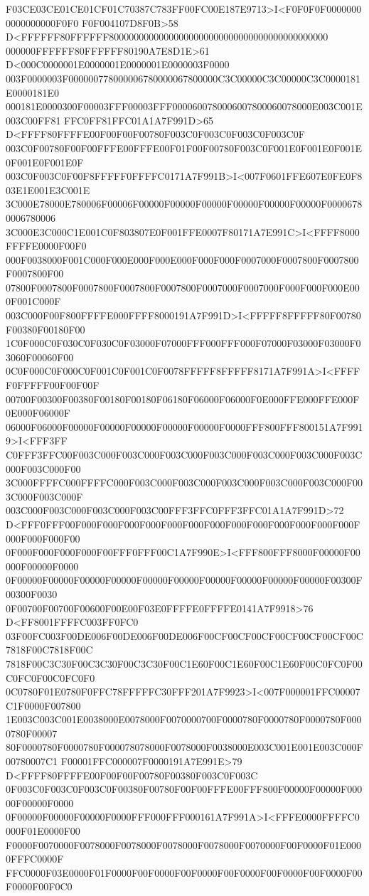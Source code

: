 F03CE03CE01CE01CF01C70387C783FF00FC00E187E9713>I<F0F0F0F00000000000000000F0F0
F0F004107D8F0B>58 D<FFFFFF80FFFFFF80000000000000000000000000000000000000000000
000000FFFFFF80FFFFFF80190A7E8D1E>61 D<000C0000001E0000001E0000001E0000003F0000
003F0000003F000000778000006780000067800000C3C00000C3C00000C3C0000181E0000181E0
000181E0000300F00003FFF00003FFF0000600780006007800060078000E003C001E003C00FF81
FFC0FF81FFC01A1A7F991D>65 D<FFFF80FFFFE00F00F00F00780F003C0F003C0F003C0F003C0F
003C0F00780F00F00FFFE00FFFE00F01F00F00780F003C0F001E0F001E0F001E0F001E0F001E0F
003C0F003C0F00F8FFFFF0FFFFC0171A7F991B>I<007F0601FFE607E0FE0F803E1E001E3C001E
3C000E78000E780006F00006F00000F00000F00000F00000F00000F00000F00006780006780006
3C000E3C000C1E001C0F803807E0F001FFE0007F80171A7E991C>I<FFFF8000FFFFE0000F00F0
000F0038000F001C000F000E000F000E000F000F000F0007000F0007800F0007800F0007800F00
07800F0007800F0007800F0007800F0007800F0007000F0007000F000F000F000E000F001C000F
003C000F00F800FFFFE000FFFF8000191A7F991D>I<FFFFF8FFFFF80F00780F00380F00180F00
1C0F000C0F030C0F030C0F03000F07000FFF000FFF000F07000F03000F03000F03060F00060F00
0C0F000C0F000C0F001C0F001C0F0078FFFFF8FFFFF8171A7F991A>I<FFFFF0FFFFF00F00F00F
00700F00300F00380F00180F00180F06180F06000F06000F0E000FFE000FFE000F0E000F06000F
06000F06000F00000F00000F00000F00000F00000F0000FFF800FFF800151A7F9919>I<FFF3FF
C0FFF3FFC00F003C000F003C000F003C000F003C000F003C000F003C000F003C000F003C000F00
3C000FFFFC000FFFFC000F003C000F003C000F003C000F003C000F003C000F003C000F003C000F
003C000F003C000F003C000F003C00FFF3FFC0FFF3FFC01A1A7F991D>72
D<FFF0FFF00F000F000F000F000F000F000F000F000F000F000F000F000F000F000F000F000F00
0F000F000F000F000F00FFF0FFF00C1A7F990E>I<FFF800FFF8000F00000F00000F00000F0000
0F00000F00000F00000F00000F00000F00000F00000F00000F00000F00000F00300F00300F0030
0F00700F00700F00600F00E00F03E0FFFFE0FFFFE0141A7F9918>76 D<FF8001FFFFC003FF0FC0
03F00FC003F00DE006F00DE006F00DE006F00CF00CF00CF00CF00CF00CF00C7818F00C7818F00C
7818F00C3C30F00C3C30F00C3C30F00C1E60F00C1E60F00C1E60F00C0FC0F00C0FC0F00C0FC0F0
0C0780F01E0780F0FFC78FFFFFC30FFF201A7F9923>I<007F000001FFC00007C1F0000F007800
1E003C003C001E0038000E0078000F0070000700F0000780F0000780F0000780F0000780F00007
80F0000780F0000780F000078078000F0078000F0038000E003C001E001E003C000F00780007C1
F00001FFC000007F0000191A7E991E>79 D<FFFF80FFFFE00F00F00F00780F00380F003C0F003C
0F003C0F003C0F003C0F00380F00780F00F00FFFE00FFF800F00000F00000F00000F00000F0000
0F00000F00000F00000F0000FFF000FFF000161A7F991A>I<FFFE0000FFFFC0000F01E0000F00
F0000F0070000F0078000F0078000F0078000F0078000F0070000F00F0000F01E0000FFFC0000F
FFC0000F03E0000F01F0000F00F0000F00F0000F00F0000F00F0000F00F0000F00F0000F00F0C0
